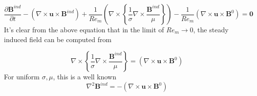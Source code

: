 \documentclass[11pt]{article}
\begin{document}
\begin{equation}
  \frac{\partial \pmb{B}^{ind}}{\partial t} 
  -
  (\nabla \times \pmb{u} \times \pmb{B}^{ind})
  +
  \frac{1}{Re_m}
  \left(
  \nabla \times
  \left\{
  \frac{1}{\sigma}
  \nabla \times
  \frac{\pmb{B}^{ind}}{\mu}
  \right\}
  \right)
  -
  \frac{1}{Re_m}
  (\nabla \times \pmb{u} \times \pmb{B}^0)
  =
  \pmb{0}
\end{equation}
It's clear from the above equation that in the limit of $Re_m \rightarrow 0$, the steady induced field can be computed from

\begin{equation}
  \nabla \times
  \left\{
  \frac{1}{\sigma}
  \nabla \times
  \frac{\pmb{B}^{ind}}{\mu}
  \right\}
  =
  (\nabla \times \pmb{u} \times \pmb{B}^0)
\end{equation}
For uniform $\sigma, \mu$, this is a well known
\begin{equation}
  \nabla^2 \pmb{B}^{ind}
  =
  -
  (\nabla \times \pmb{u} \times \pmb{B}^0)
\end{equation}
\end{document}
